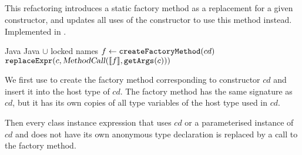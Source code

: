 \subsection{}
This refactoring introduces a static factory method as a replacement for a given constructor, and updates all uses of the constructor to use this method instead. Implemented in .

\begin{algorithm}
\caption{$\refactoring{Introduce Factory}(cd : \type{ConstructorDecl})$}
\begin{algorithmic}[1]
\REQUIRE Java
\ENSURE Java $\cup$ locked names
\medskip
\STATE $f \leftarrow \text{\texttt{createFactoryMethod}}(cd)$
  \STATE $\text{\texttt{replaceExpr}}(c, \text{\textsl{MethodCall}}(\llbracket f\rrbracket, \text{\texttt{getArgs}}(c)))$
\ENDFOR
\end{algorithmic}
\end{algorithm}

We first use  to create the factory method corresponding to constructor $cd$ and insert it into the host type of $cd$. The factory method has the same signature as $cd$, but it has its own copies of all type variables of the host type used in $cd$.

Then every class instance expression that uses $cd$ or a parameterised instance of $cd$ and does not have its own anonymous type declaration is replaced by a call to the factory method.
